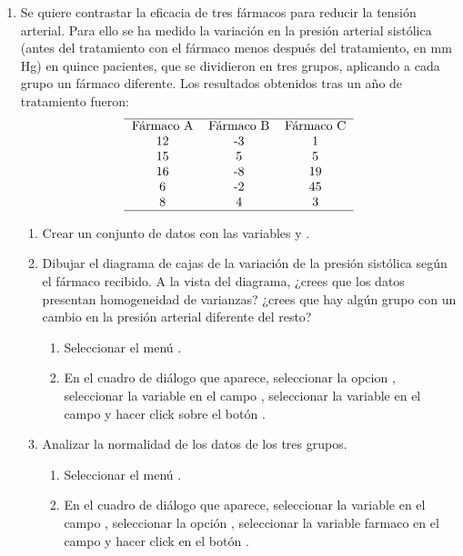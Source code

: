 \begin{enumerate}[leftmargin=*]
\item Se quiere contrastar la eficacia de tres fármacos para reducir la tensión arterial. Para ello se ha medido la
variación en la presión arterial sistólica (antes del tratamiento con el fármaco menos después del tratamiento, en mm
Hg) en quince pacientes, que se dividieron en tres grupos, aplicando a cada grupo un fármaco diferente. Los resultados
obtenidos tras un año de tratamiento fueron:
\[
\begin{tabular}{ccc}
\hline 
Fármaco A & Fármaco B & Fármaco C\\
12 & -3 & 1 \\
15 &  5 & 5 \\
16 & -8 & 19 \\
 6 & -2 & 45 \\
 8 &  4 &  3 \\
\hline
\end{tabular}
\]
\begin{enumerate}
\item Crear un conjunto de datos con las variables  y .

\item Dibujar el diagrama de cajas de la variación de la presión sistólica según el fármaco recibido.
A la vista del diagrama, ¿crees que los datos presentan homogeneidad de varianzas? 
¿crees que hay algún grupo con un cambio en la presión arterial diferente del resto?
\begin{indicacion}
\begin{enumerate}
\item Seleccionar el menú .
\item En el cuadro de diálogo que aparece, seleccionar la opcion , seleccionar la variable
 en el campo , seleccionar la variable  en el campo
 y hacer click sobre el botón .
\end{enumerate}
\end{indicacion}

\item Analizar la normalidad de los datos de los tres grupos. 
\begin{indicacion}
\begin{enumerate}
\item Seleccionar el menú .
\item En el cuadro de diálogo que aparece, seleccionar la variable  en el campo ,
seleccionar la opción , seleccionar la variable {farmaco} en el campo  y
hacer click en el botón .
\end{enumerate}
\end{indicacion}


\end{enumerate}
\end{enumerate}

